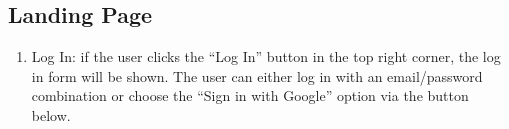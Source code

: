 \documentclass[conference]{IEEEtran}
\begin{document}
\subsection{Landing Page}
\begin{enumerate}
    \item Log In: if the user clicks the “Log In” button in the top right corner, the log in form will be shown. The user can either log in with an email/password combination or choose the “Sign in with Google” option via the button below.
\end{enumerate}
















\end{document}

